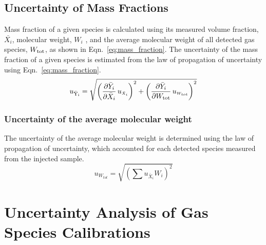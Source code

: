 \documentclass[12pt]{article}
\begin{document}
\subsection{Uncertainty of Mass Fractions}
\label{ssec:Uncertainty of Mass Fractions}

Mass fraction of a given species is calculated using its measured volume fraction, $\bar{X_{i}}$, molecular weight, $W_i$ , and the average molecular weight of all detected gas species, $W_{\rm tot}$, as shown in Eqn.~\ref{eq:mass_fraction}. The uncertainty of the mass fraction of a given species is estimated from the law of propagation of uncertainty using Eqn.~\ref{eq:mass_fraction}.
\begin{equation}\label{eq:Mass_Frac_Uncertainty}
u_\mathrm{\bar{Y}_{i}} = \sqrt{{\left( \frac{\partial \bar{Y}_{i}}{\partial \bar{X}_{i}}\,u_{\scriptscriptstyle \bar{X}_{i}} \right)}^2+{\left(\frac{\partial \bar{Y}_{i}}{\partial W_{\rm tot}}\,u_{\scriptscriptstyle W_{tot}}\right)}^2}
\end{equation}

\subsubsection{Uncertainty of the average molecular weight}
\label{ssec:Uncertainty of the average molecular weight}

The uncertainty of the average molecular weight is determined using the law of propagation of uncertainty, which accounted for each detected species measured from the injected sample.
\begin{equation}\label{eq:Uncertainty_Total_MW}
	u_{\scriptscriptstyle W_{tot}}=\sqrt{\left(\sum{{u_{\scriptscriptstyle \bar{X}_{i}}}{{W_{i}}}}\right)^2}
\end{equation}

\pagebreak

\section{Uncertainty Analysis of Gas Species Calibrations}\label{sec:Uncertainty Analysis of Gas Species Calibrations}
\end{document}
